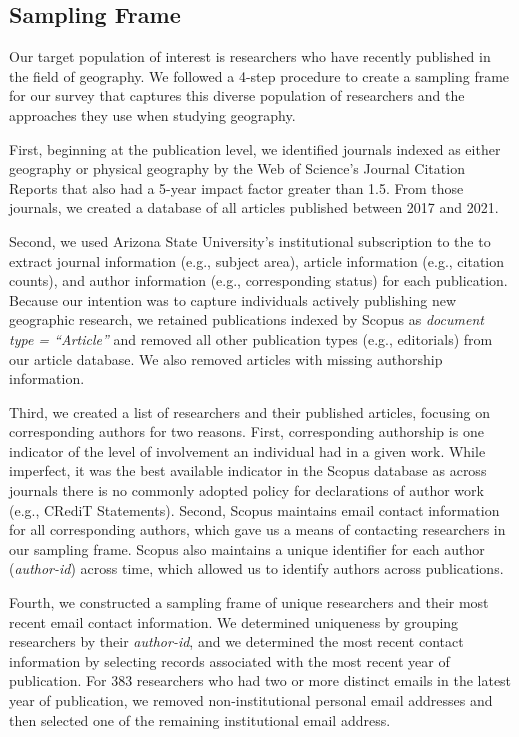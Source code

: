 \documentclass[]{interact}
\newcommand{\citep}{\parencite}
\theoremstyle{plain}%
\theoremstyle{definition}
\theoremstyle{remark}
\begin{document}
\subsection*{Sampling Frame}
Our target population of interest is researchers who have recently published in the field of geography. 
We followed a 4-step procedure to create a sampling frame for our survey that captures this diverse population of researchers and the approaches they use when studying geography. 

First, beginning at the publication level, we identified journals indexed as either geography or physical geography by the Web of Science's Journal Citation Reports \citep{WOS} that also had a 5-year impact factor greater than 1.5.
From those journals, we created a database of all articles published between 2017 and 2021.  

Second, we used Arizona State University's institutional subscription to the \textcite{Scopus} to extract journal information (e.g., subject area), article information (e.g., citation counts), and author information (e.g., corresponding status) for each publication. 
Because our intention was to capture individuals actively publishing new geographic research, we retained publications indexed by Scopus as \textit{document type = ``Article''} and removed all other publication types (e.g., editorials) from our article database. 
We also removed articles with missing authorship information. 

Third, we created a list of researchers and their published articles, focusing on corresponding authors for two reasons.
First, corresponding authorship is one indicator of the level of involvement an individual had in a given work. 
While imperfect, it was the best available indicator in the Scopus database as across journals there is no commonly adopted policy for declarations of author work (e.g., CRediT Statements).
Second, Scopus maintains email contact information for all corresponding authors, which gave us a means of contacting researchers in our sampling frame.
Scopus also maintains a unique identifier for each author (\textit{author-id}) across time, which allowed us to identify authors across publications. 

Fourth, we constructed a sampling frame of unique researchers and their most recent email contact information. 
We determined uniqueness by grouping researchers by their \textit{author-id}, and we determined the most recent contact information by selecting records associated with the most recent year of publication. 
For 383 researchers who had two or more distinct emails in the latest year of publication, we removed non-institutional personal email addresses and then selected one of the remaining institutional email address.
\end{document}
